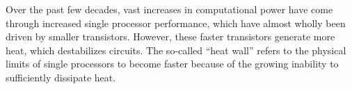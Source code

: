 




Over the past few decades, vast increases in computational power have come through increased single processor performance, which have almost wholly been driven by smaller transistors. However, these faster transistors generate more heat, which destabilizes circuits. The so-called ``heat wall'' refers to the physical limits of single processors to become faster because of the growing inability to sufficiently dissipate heat.

